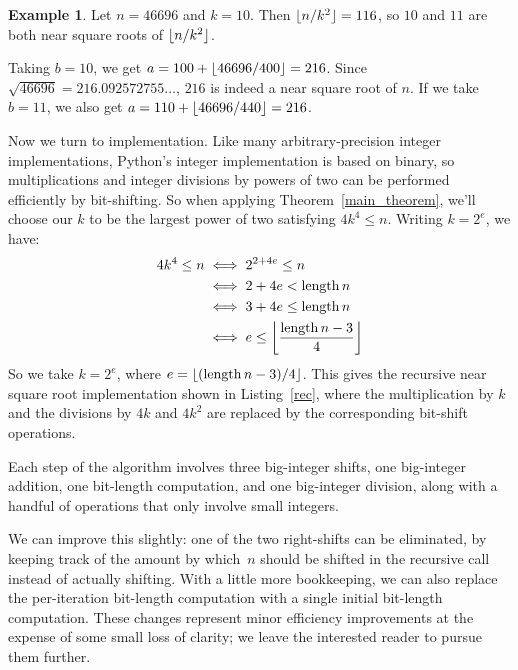 \documentclass[a4paper]{article}
\DeclarePairedDelimiter\floor{\lfloor}{\rfloor}
\DeclareMathOperator{\length}{length}
\theoremstyle{plain}
\theoremstyle{definition}
\newtheorem{example}[theorem]{Example}
\begin{document}
\begin{example}
  Let $n = 46696$ and $k=10$. Then $\floor{n / k^2} = 116$, so $10$ and
  $11$ are both near square roots of $\floor{n / k^2}$.

  Taking $b = 10$, we get $a = 100 + \floor{46696 / 400} = 216$. Since
  $\sqrt{46696} = 216.092572755\dots$, $216$ is indeed a near square root of
  $n$. If we take $b = 11$, we also get $a = 110 + \floor{46696 / 440} = 216$.
\end{example}

Now we turn to implementation. Like many arbitrary-precision integer
implementations, Python's integer implementation is based on binary, so
multiplications and integer divisions by powers of two can be performed
efficiently by bit-shifting. So when applying Theorem~\ref{main_theorem}, we'll
choose our $k$ to be the largest power of two satisfying $4k^4 \le n$. Writing
$k=2^e$, we have:
\begin{align*}
  4k^4 \le n
  &\iff 2^{2 + 4e} \le n \\
  &\iff 2 + 4e < \length n \\
  &\iff 3 + 4e \le \length n \\
  &\iff e \le \floor*{\frac{\length n - 3}{4}}
\end{align*}
So we take $k = 2^e$, where $e={\floor{(\length n - 3)/4}}$. This gives the recursive
near square root implementation shown in Listing~\ref{rec}, where the
multiplication by $k$ and the divisions by $4k$ and $4k^2$ are replaced by the
corresponding bit-shift operations.



Each step of the algorithm involves three big-integer shifts, one
big-integer addition, one bit-length computation, and one big-integer division,
along with a handful of operations that only involve small integers.

We can improve this slightly: one of the two right-shifts can be eliminated, by
keeping track of the amount by which~$n$ should be shifted in the recursive
call instead of actually shifting. With a little more bookkeeping, we can
also replace the per-iteration bit-length computation with a single
initial bit-length computation. These changes represent minor efficiency
improvements at the expense of some small loss of clarity; we leave the
interested reader to pursue them further.
\end{document}
